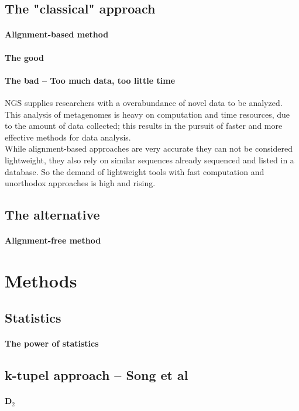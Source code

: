 \documentclass[twocolumn]{bmcart}%
\begin{document}
\subsection*{The "classical" approach}
\paragraph*{Alignment-based method}

\paragraph*{The good}
\paragraph*{The bad -- Too much data, too little time}
NGS supplies researchers with a overabundance of novel data to be analyzed. This analysis of metagenomes is heavy on computation and time resources, due to the amount of data collected; this results in the pursuit of faster and more effective methods for data analysis. \\
While alignment-based approaches are very accurate they can not be considered lightweight, they also rely on similar sequences already sequenced and listed in a database. So the demand of lightweight tools with fast computation and unorthodox approaches is high and rising.
\subsection*{The alternative}
\paragraph*{Alignment-free method}
\section*{Methods}
\subsection*{Statistics}
\paragraph*{The power of statistics}
\subsection*{k-tupel approach -- Song et al}
\paragraph*{D$_2$}
\end{document}
